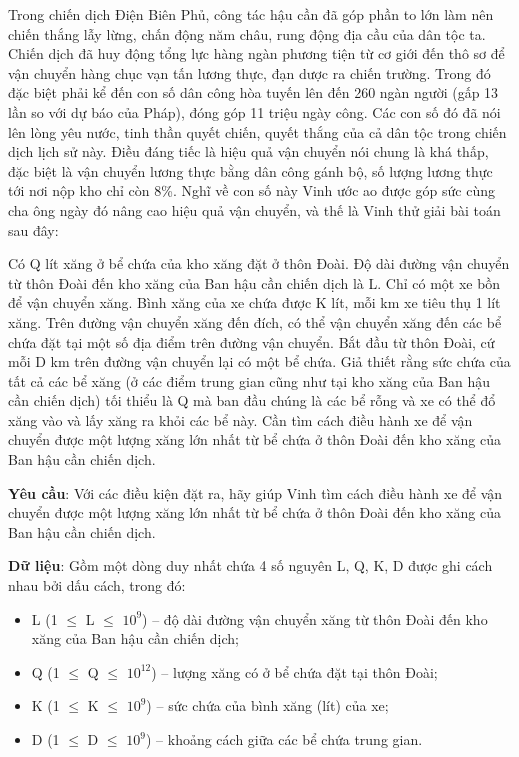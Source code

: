 

Trong chiến dịch Điện Biên Phủ, công tác hậu cần đã góp phần to lớn làm nên chiến thắng lẫy lừng, chấn động năm châu, rung động địa cầu của dân tộc ta. Chiến dịch đã huy động tổng lực hàng ngàn phương tiện từ cơ giới đến thô sơ để vận chuyển hàng chục vạn tấn lương thực, đạn dược ra chiến trường. Trong đó đặc biệt phải kể đến con số dân công hòa tuyến lên đến 260 ngàn người (gấp 13 lần so với dự báo của Pháp), đóng góp 11 triệu ngày công. Các con số đó đã nói lên lòng yêu nước, tinh thần quyết chiến, quyết thắng của cả dân tộc trong chiến dịch lịch sử này. Điều đáng tiếc là hiệu quả vận chuyển nói chung là khá thấp, đặc biệt là vận chuyển lương thực bằng dân công gánh bộ, số lượng lương thực tới nơi nộp kho chỉ còn 8\%. Nghĩ về con số này Vinh ước ao được góp sức cùng cha ông ngày đó nâng cao hiệu quả vận chuyển, và thế là Vinh thử giải bài toán sau đây:

Có Q lít xăng ở bể chứa của kho xăng đặt ở thôn Đoài. Độ dài đường vận chuyển từ thôn Đoài đến kho xăng của Ban hậu cần chiến dịch là L. Chỉ có một xe bồn để vận chuyển xăng. Bình xăng của xe chứa được K lít, mỗi km xe tiêu thụ 1 lít xăng. Trên đường vận chuyển xăng đến đích, có thể vận chuyển xăng đến các bể chứa đặt tại một số địa điểm trên đường vận chuyển. Bắt đầu từ thôn Đoài, cứ mỗi D km trên đường vận chuyển lại có một bể chứa. Giả thiết rằng sức chứa của tất cả các bể xăng (ở các điểm trung gian cũng như tại kho xăng của Ban hậu cần chiến dịch) tối thiểu là Q mà ban đầu chúng là các bể rỗng và xe có thể đổ xăng vào và lấy xăng ra khỏi các bể này. Cần tìm cách điều hành xe để vận chuyển được một lượng xăng lớn nhất từ bể chứa ở thôn Đoài đến kho xăng của Ban hậu cần chiến dịch.

\textbf{Yêu cầu}: Với các điều kiện đặt ra, hãy giúp Vinh tìm cách điều hành xe để vận chuyển được một lượng xăng lớn nhất từ bể chứa ở thôn Đoài đến kho xăng của Ban hậu cần chiến dịch.

\textbf{Dữ liệu}: Gồm một dòng duy nhất chứa 4 số nguyên L, Q, K, D được ghi cách nhau bởi dấu cách, trong đó:
\begin{itemize}
	\item L (1  $\le$  L  $\le$  $10^{9}$) – độ dài đường vận chuyển xăng từ thôn Đoài đến kho xăng của Ban hậu cần chiến dịch;
	\item Q (1  $\le$  Q  $\le$  $10^{12}$) – lượng xăng có ở bể chứa đặt tại thôn Đoài;
	\item K (1  $\le$  K  $\le$  $10^{9}$) – sức chứa của bình xăng (lít) của xe;
	\item D (1  $\le$  D  $\le$  $10^{9}$) – khoảng cách giữa các bể chứa trung gian.
\end{itemize}


